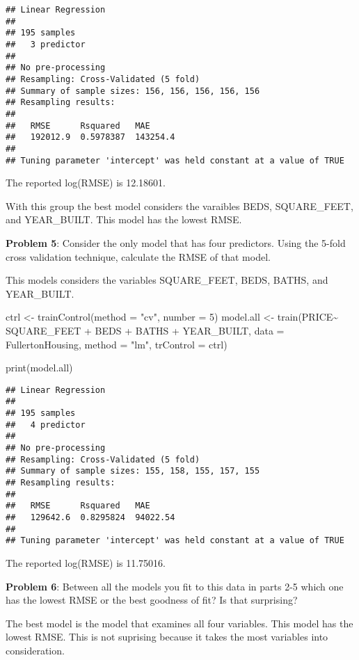 \documentclass[
]{article}
\newenvironment{Shaded}{\begin{snugshade}}{\end{snugshade}}
\newcommand{\AttributeTok}[1]{\textcolor[rgb]{0.77,0.63,0.00}{#1}}
\newcommand{\DecValTok}[1]{\textcolor[rgb]{0.00,0.00,0.81}{#1}}
\newcommand{\FunctionTok}[1]{\textcolor[rgb]{0.00,0.00,0.00}{#1}}
\newcommand{\NormalTok}[1]{#1}
\newcommand{\OtherTok}[1]{\textcolor[rgb]{0.56,0.35,0.01}{#1}}
\newcommand{\SpecialCharTok}[1]{\textcolor[rgb]{0.00,0.00,0.00}{#1}}
\newcommand{\StringTok}[1]{\textcolor[rgb]{0.31,0.60,0.02}{#1}}
\begin{document}
\begin{verbatim}
## Linear Regression 
## 
## 195 samples
##   3 predictor
## 
## No pre-processing
## Resampling: Cross-Validated (5 fold) 
## Summary of sample sizes: 156, 156, 156, 156, 156 
## Resampling results:
## 
##   RMSE      Rsquared   MAE     
##   192012.9  0.5978387  143254.4
## 
## Tuning parameter 'intercept' was held constant at a value of TRUE
\end{verbatim}

The reported log(RMSE) is 12.18601.

With this group the best model considers the varaibles BEDS,
SQUARE\_FEET, and YEAR\_BUILT. This model has the lowest RMSE.

\textbf{Problem 5}: Consider the only model that has four predictors.
Using the 5-fold cross validation technique, calculate the RMSE of that
model.

This models considers the variables SQUARE\_FEET, BEDS, BATHS, and
YEAR\_BUILT.

\begin{Shaded}
\begin{Highlighting}[]
\NormalTok{ctrl }\OtherTok{\textless{}{-}} \FunctionTok{trainControl}\NormalTok{(}\AttributeTok{method =} \StringTok{"cv"}\NormalTok{, }\AttributeTok{number =} \DecValTok{5}\NormalTok{)}
\NormalTok{model.all }\OtherTok{\textless{}{-}} \FunctionTok{train}\NormalTok{(PRICE}\SpecialCharTok{\textasciitilde{}}\NormalTok{ SQUARE\_FEET }\SpecialCharTok{+}\NormalTok{ BEDS }\SpecialCharTok{+}\NormalTok{ BATHS }\SpecialCharTok{+}\NormalTok{ YEAR\_BUILT, }
               \AttributeTok{data =}\NormalTok{ FullertonHousing, }\AttributeTok{method =} \StringTok{"lm"}\NormalTok{, }\AttributeTok{trControl =}\NormalTok{ ctrl)}

\FunctionTok{print}\NormalTok{(model.all)}
\end{Highlighting}
\end{Shaded}

\begin{verbatim}
## Linear Regression 
## 
## 195 samples
##   4 predictor
## 
## No pre-processing
## Resampling: Cross-Validated (5 fold) 
## Summary of sample sizes: 155, 158, 155, 157, 155 
## Resampling results:
## 
##   RMSE      Rsquared   MAE     
##   129642.6  0.8295824  94022.54
## 
## Tuning parameter 'intercept' was held constant at a value of TRUE
\end{verbatim}

The reported log(RMSE) is 11.75016.

\textbf{Problem 6}: Between all the models you fit to this data in parts
2-5 which one has the lowest RMSE or the best goodness of fit? Is that
surprising?

The best model is the model that examines all four variables. This model
has the lowest RMSE. This is not suprising because it takes the most
variables into consideration.
\end{document}
